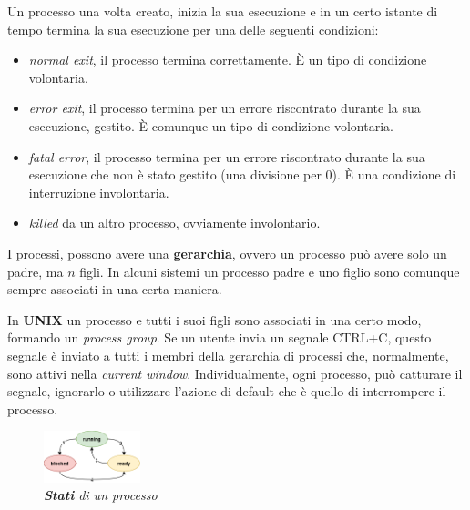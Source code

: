 Un processo una volta creato, inizia la sua esecuzione e in un certo istante di tempo termina la sua esecuzione per una delle seguenti condizioni:
\begin{itemize}[nosep]
    \item \textit{normal exit}, il processo termina correttamente. È un tipo di condizione volontaria.
    \item \textit{error exit}, il processo termina per un errore riscontrato durante la sua esecuzione, gestito. È comunque un tipo di condizione volontaria.
    \item \textit{fatal error}, il processo termina per un errore riscontrato durante la sua esecuzione che non è stato gestito (una divisione per 0). È una condizione di interruzione involontaria.
    \item \textit{killed} da un altro processo, ovviamente involontario.
\end{itemize}
I processi, possono avere una \textbf{gerarchia}, ovvero un processo può avere solo un padre, ma $n$ figli. In alcuni sistemi un processo padre e uno figlio sono comunque sempre associati in una certa maniera.
\begin{boxA}
    In \textbf{UNIX} un processo e tutti i suoi figli sono associati in una certo modo, formando un \textit{process group}. Se un utente invia un segnale CTRL+C, questo segnale è inviato a tutti i membri della gerarchia di processi che, normalmente, sono attivi nella \textit{current window}. Individualmente, ogni processo, può catturare il segnale, ignorarlo o utilizzare l'azione di default che è quello di interrompere il processo.
\end{boxA}

\begin{figure}
    \centering
    \includegraphics[width=0.25\textwidth]{img/proc_rrb}
    \caption{\textit{\textbf{Stati} di un processo}}
\end{figure}

